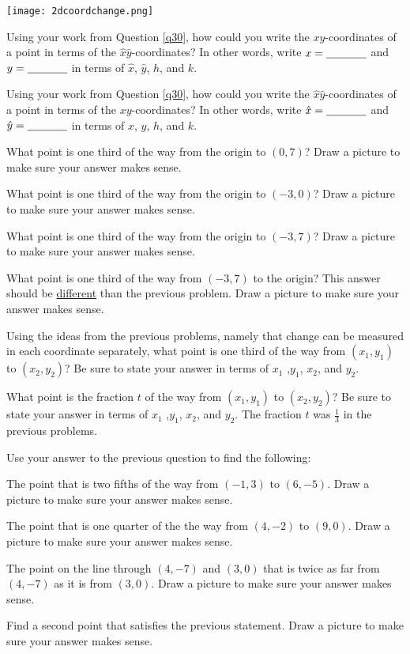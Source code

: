 \begin{center} \texttt{[image: 2dcoordchange.png]} \end{center}
\eq

\bq \label{q31}  \be
\item Using your work from Question \ref{q30}, how could you write the $xy$-coordinates of a point in terms of the $\hat{x} \hat{y}$-coordinates? In other words, write $x=\underline{\hspace{.5in}}$ and $y=\underline{\hspace{.5in}}$ in terms of $\hat{x}$, $\hat{y}$, $h$, and $k$.
\item Using your work from Question \ref{q30}, how could you write the $\hat{x} \hat{y}$-\break coordinates of a point in terms of the $xy$-coordinates? In other words, write $\hat{x}=\underline{\hspace{.5in}}$ and $\hat{y}=\underline{\hspace{.5in}}$ in terms of $x$, $y$, $h$, and $k$.
\ee
\eq


\bq\label{q13} What point is one third of the way from the origin to $(0,7)$? Draw a picture to make sure your answer makes sense.
\eq

\bq What point is one third of the way from the origin to $(-3,0)$? Draw a picture to make sure your answer makes sense.
\eq

\bq What point is one third of the way from the origin to $(-3,7)$? Draw a picture to make sure your answer makes sense.
\eq

\bq What point is one third of the way from $(-3,7)$ to the origin? This answer should be \underline{different} than the previous problem. Draw a picture to make sure your answer makes sense.
\eq

\bq Using the ideas from the previous problems, namely that change can be measured in each coordinate separately, what point is one third of the way from $(x_1,y_1)$ to $(x_2,y_2)$? Be sure to state your answer in terms of $x_1$ ,$y_1$, $x_2$, and $y_2$.
\eq

\bq What point is the fraction $t$ of the way from $(x_1,y_1)$ to $(x_2,y_2)$? Be sure to state your answer in terms of $x_1$ ,$y_1$, $x_2$, and $y_2$. The fraction $t$ was $\frac{1}{3}$ in the previous problems.
\eq

\bq\label{q14} Use your answer to the previous question to find the following:
\be
\item The point that is two fifths of the way from $(-1,3)$ to $(6,-5)$. Draw a picture to make sure your answer makes sense.
\item The point that is one quarter of the the way from $(4,-2)$ to $(9,0)$. Draw a picture to make sure your answer makes sense.
\item The point on the line through $(4,-7)$ and $(3,0)$ that is twice as far from $(4,-7)$ as it is from $(3,0)$. Draw a picture to make sure your answer makes sense.
\item Find a second point that satisfies the previous statement. Draw a picture to make sure your answer makes sense.
\ee
\eq

